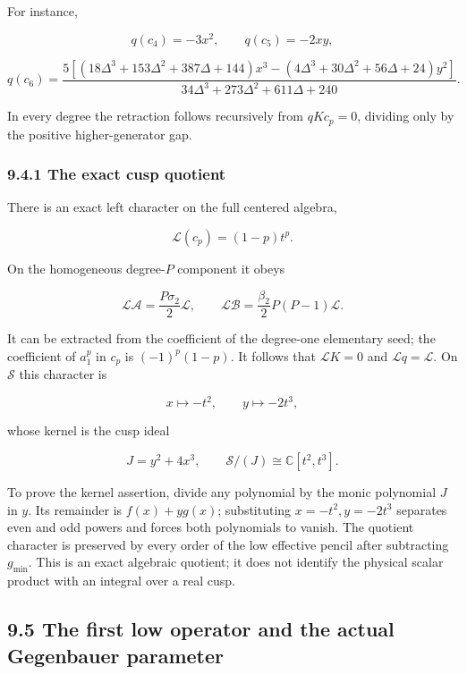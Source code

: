 For instance,

\[
q(c_4)=-3x^2,\qquad q(c_5)=-2xy,
\]

\[
q(c_6)=
\frac{5[(18\Delta^3+153\Delta^2+387\Delta+144)x^3
-(4\Delta^3+30\Delta^2+56\Delta+24)y^2]}
{34\Delta^3+273\Delta^2+611\Delta+240}.
\]

In every degree the retraction follows recursively from \(qKc_p=0\), dividing only by the positive higher-generator gap.

\hypertarget{the-exact-cusp-quotient}{%
\subsubsection{9.4.1 The exact cusp quotient}\label{the-exact-cusp-quotient}}

There is an exact left character on the full centered algebra,

\[
\mathcal L(c_p)=(1-p)t^p.
\]

On the homogeneous degree-\(P\) component it obeys

\[
\mathcal L\mathscr A=\frac{P\sigma_2}{2}\mathcal L,\qquad
\mathcal L\mathscr B=\frac{\beta_2}{2}P(P-1)\mathcal L.
\]

It can be extracted from the coefficient of the degree-one elementary seed; the coefficient of \(a_1^p\) in \(c_p\) is \((-1)^p(1-p)\). It follows that \(\mathcal LK=0\) and \(\mathcal Lq=\mathcal L\). On \(\mathcal S\) this character is

\[
x\longmapsto-t^2,\qquad y\longmapsto-2t^3,
\]

whose kernel is the cusp ideal

\[
J=y^2+4x^3,\qquad
\mathcal S/(J)\cong\mathbb C[t^2,t^3].
\]

To prove the kernel assertion, divide any polynomial by the monic polynomial \(J\) in \(y\). Its remainder is \(f(x)+yg(x)\); substituting \(x=-t^2,y=-2t^3\) separates even and odd powers and forces both polynomials to vanish. The quotient character is preserved by every order of the low effective pencil after subtracting \(g_{\min}\). This is an exact algebraic quotient; it does not identify the physical scalar product with an integral over a real cusp.

\hypertarget{the-first-low-operator-and-the-actual-gegenbauer-parameter}{%
\subsection{9.5 The first low operator and the actual Gegenbauer parameter}\label{the-first-low-operator-and-the-actual-gegenbauer-parameter}}

